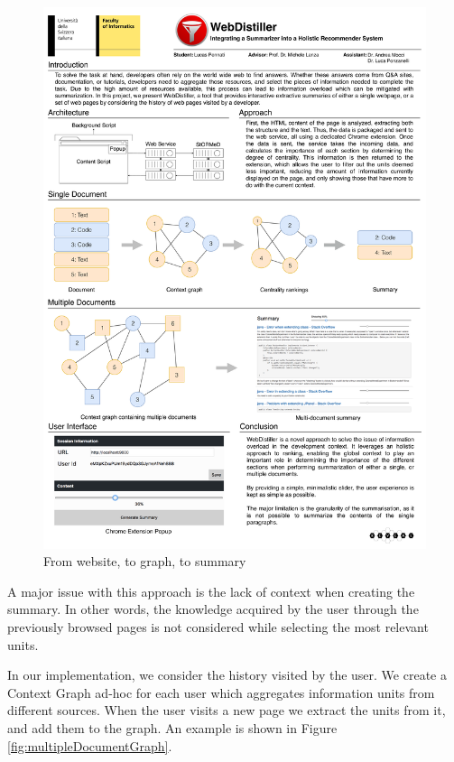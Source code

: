 \begin{figure}[H]
\centering
\includegraphics[scale=0.2]{Figures/graphs}
\caption{From website, to graph, to summary}
\label{fig:graph}
\end{figure} 

A major issue with this approach is the lack of context when creating the summary. In other words, the knowledge acquired by the user through the previously browsed pages is not considered while selecting the most relevant units.

In our implementation, we consider the history visited by the user. We create a Context Graph ad-hoc for each user which aggregates information units from different sources. When the user visits a new page we extract the units from it, and add them to the graph. An example is shown in Figure \ref{fig:multipleDocumentGraph}.


